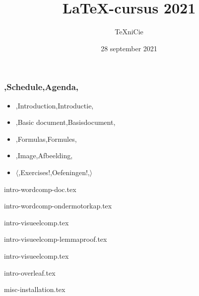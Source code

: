 \documentclass{cursuspresentatie}
\title{\LaTeX{}-cursus 2021}
\author{\TeX niCie}
\date{28 september 2021}
\def\importslide#1#2{%
	{#2}
}
\begin{document}


\begin{frame}
	\titlepage
	\centering
\end{frame}

\begin{frame}
	\frametitle{\lang,Schedule,Agenda,}
	
	\begin{itemize}
		\item \lang,Introduction,Introductie,
		\item \lang,Basic document,Basisdocument,
		\item \lang,Formulas,Formules,
		\item \lang,Image,Afbeelding,
		\item $ \mathbf\langle $\lang,Exercises!,Oefeningen!,$ \rangle $
	\end{itemize}
\end{frame}

	\clearrecentlist

    \def\assetdir{assets}
	
    \importslide{intro}{intro-wordcomp-doc.tex}

    \def\frameselection{2}
	\importslide{intro}{intro-wordcomp-ondermotorkap.tex}

    \def\frameselection{3}
	\importslide{intro}{intro-visueelcomp.tex}

    \importslide{intro}{intro-visueelcomp-lemmaproof.tex}

    \def\frameselection{5,7}
    \importslide{intro}{intro-visueelcomp.tex}

    \importslide{intro}{intro-overleaf.tex}

	\importslide{misc}{misc-installation.tex}

\end{document}
